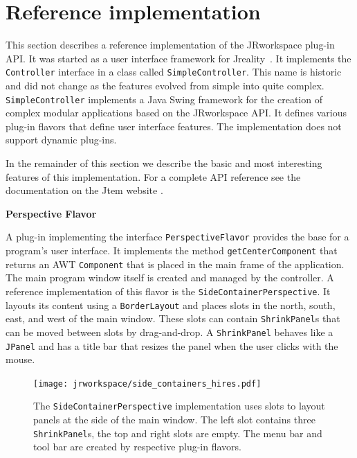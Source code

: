 \documentclass[Thesis.tex]{subfiles}
\begin{document}

\section{Reference implementation}
\label{sec:reference_implementation}
This section describes a reference implementation of the {\sc JRworkspace} plug-in API.
It was started as a user interface framework for {\sc Jreality}~\cite{JrealityWebsite}. It implements
the {\tt Controller} interface in a class called {\tt SimpleController}. This name is historic
and did not change as the features evolved from simple into quite complex.
{\tt SimpleController} implements a {\sc Java Swing\TReg} framework for the creation of complex
modular applications based on the {\sc JRworkspace} API. It defines various plug-in flavors
that define user interface features. The implementation does not support dynamic plug-ins.

In the remainder of this section we describe the basic and most interesting features of this 
implementation. For a complete API reference see the documentation on the {\sc Jtem} website 
\cite{JtemWebsite}.


{\bf Perspective Flavor}

A plug-in implementing the interface {\tt PerspectiveFlavor} provides the base for a program's user 
interface. It implements the method {\tt getCenterComponent} that returns an AWT {\tt Component}
that is placed in the main frame of the application. The main program window itself is created and
managed by the controller.
A reference implementation of this flavor is the {\tt SideContainerPerspective}. It layouts its content 
using a {\tt BorderLayout} and places slots in the north, south, east, and west of the main window. These
slots can contain {\tt ShrinkPanel}s that can be moved between slots by drag-and-drop. A {\tt ShrinkPanel}
behaves like a {\tt JPanel} and has a title bar that resizes the panel when the user clicks with the mouse.

\begin{figure}[H]
\centering
\texttt{[image: jrworkspace/side\_containers\_hires.pdf]}
\caption[The {\tt SideContainerPerspective} user interface plug-in]{The {\tt SideContainerPerspective} implementation uses slots to layout panels at the side of the
main window. The left slot contains three {\tt ShrinkPanel}s, the top and right slots are empty. The menu bar 
and tool bar are created by respective plug-in flavors.}
\label{fig:side_containers}
\end{figure}
\end{document}
